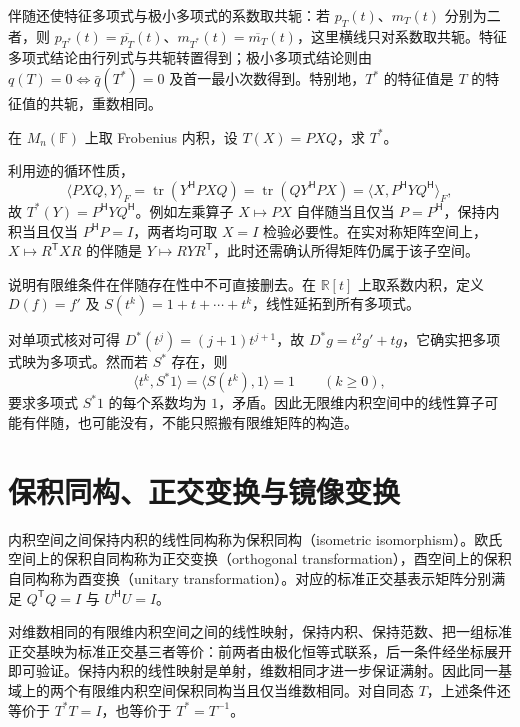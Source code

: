 伴随还使特征多项式与极小多项式的系数取共轭：若 $p_T(t)$、$m_T(t)$ 分别为二者，则 $p_{T^*}(t)=\overline{p_T}(t)$、$m_{T^*}(t)=\overline{m_T}(t)$，这里横线只对系数取共轭。特征多项式结论由行列式与共轭转置得到；极小多项式结论则由 $q(T)=0\Longleftrightarrow\bar q(T^*)=0$ 及首一最小次数得到。特别地，$T^*$ 的特征值是 $T$ 的特征值的共轭，重数相同。

\begin{example}
在 $M_n(\mathbb F)$ 上取 Frobenius 内积，设 $T(X)=PXQ$，求 $T^*$。
\end{example}
\begin{solve}
利用迹的循环性质，
\[
\langle PXQ,Y\rangle_F=\operatorname{tr}(Y^{\mathsf H}PXQ)
=\operatorname{tr}(QY^{\mathsf H}PX)=\langle X,P^{\mathsf H}YQ^{\mathsf H}\rangle_F,
\]
故 $T^*(Y)=P^{\mathsf H}YQ^{\mathsf H}$。例如左乘算子 $X\mapsto PX$ 自伴随当且仅当 $P=P^{\mathsf H}$，保持内积当且仅当 $P^{\mathsf H}P=I$，两者均可取 $X=I$ 检验必要性。在实对称矩阵空间上，$X\mapsto R^{\mathsf T}XR$ 的伴随是 $Y\mapsto RYR^{\mathsf T}$，此时还需确认所得矩阵仍属于该子空间。
\end{solve}

\begin{example}
说明有限维条件在伴随存在性中不可直接删去。在 $\mathbb R[t]$ 上取系数内积，定义 $D(f)=f'$ 及 $S(t^k)=1+t+\cdots+t^k$，线性延拓到所有多项式。
\end{example}
\begin{solve}
对单项式核对可得 $D^*(t^j)=(j+1)t^{j+1}$，故 $D^*g=t^2g'+tg$，它确实把多项式映为多项式。然而若 $S^*$ 存在，则
\[
\langle t^k,S^*1\rangle=\langle S(t^k),1\rangle=1\qquad(k\geq0),
\]
要求多项式 $S^*1$ 的每个系数均为 $1$，矛盾。因此无限维内积空间中的线性算子可能有伴随，也可能没有，不能只照搬有限维矩阵的构造。
\end{solve}

\section{保积同构、正交变换与镜像变换}
\label{sec:xie-ip-isometry}

\begin{definition}
内积空间之间保持内积的线性同构称为保积同构（isometric isomorphism）。欧氏空间上的保积自同构称为正交变换（orthogonal transformation），酉空间上的保积自同构称为酉变换（unitary transformation）。对应的标准正交基表示矩阵分别满足 $Q^{\mathsf T}Q=I$ 与 $U^{\mathsf H}U=I$。
\end{definition}

对维数相同的有限维内积空间之间的线性映射，保持内积、保持范数、把一组标准正交基映为标准正交基三者等价：前两者由极化恒等式联系，后一条件经坐标展开即可验证。保持内积的线性映射是单射，维数相同才进一步保证满射。因此同一基域上的两个有限维内积空间保积同构当且仅当维数相同。对自同态 $T$，上述条件还等价于 $T^*T=I$，也等价于 $T^*=T^{-1}$。


